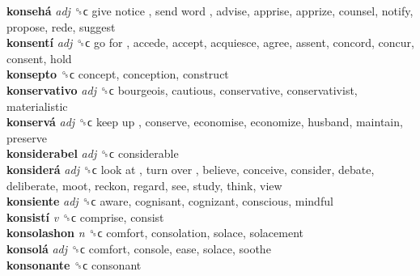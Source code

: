 \textbf{konsehá} \emph{adj}  ␝ϲ   give notice ,  send word , advise, apprise, apprize, counsel, notify, propose, rede, suggest  \\
\textbf{konsentí} \emph{adj}  ␝ϲ   go for , accede, accept, acquiesce, agree, assent, concord, concur, consent, hold  \\
\textbf{konsepto} ␝ϲ  concept, conception, construct  \\
\textbf{konservativo} \emph{adj}  ␝ϲ  bourgeois, cautious, conservative, conservativist, materialistic  \\
\textbf{konservá} \emph{adj}  ␝ϲ   keep up , conserve, economise, economize, husband, maintain, preserve  \\
\textbf{konsiderabel} \emph{adj}  ␝ϲ  considerable  \\
\textbf{konsiderá} \emph{adj}  ␝ϲ   look at ,  turn over , believe, conceive, consider, debate, deliberate, moot, reckon, regard, see, study, think, view  \\
\textbf{konsiente} \emph{adj}  ␝ϲ  aware, cognisant, cognizant, conscious, mindful  \\
\textbf{konsistí} \emph{v}  ␝ϲ  comprise, consist  \\
\textbf{konsolashon} \emph{n}  ␝ϲ  comfort, consolation, solace, solacement  \\
\textbf{konsolá} \emph{adj}  ␝ϲ  comfort, console, ease, solace, soothe  \\
\textbf{konsonante} ␝ϲ  consonant  \\
